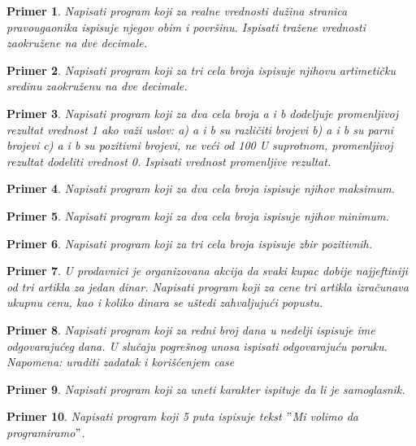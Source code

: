 \documentclass[a4paper]{article}
\newtheorem{primer}{Primer}[section]
\begin{document}
\begin{primer}
Napisati program koji za realne vrednosti dužina
stranica pravougaonika ispisuje njegov obim i površinu. Ispisati tražene vrednosti
zaokružene na dve decimale. 
\end{primer}

\begin{primer}
Napisati program koji za tri cela broja ispisuje
njihovu artimetičku sredinu zaokruženu na dve decimale.
\end{primer}

\begin{primer}
Napisati program koji za dva cela broja a i b dodeljuje
promenljivoj rezultat vrednost 1 ako važi uslov:
a) a i b su različiti brojevi
b) a i b su parni brojevi
c) a i b su pozitivni brojevi, ne veći od 100
U suprotnom, promenljivoj rezultat dodeliti vrednost 0. Ispisati vrednost promenljive
rezultat.
\end{primer}

\begin{primer}
Napisati program koji za dva cela broja ispisuje
njihov maksimum.
\end{primer}

\begin{primer}
Napisati program koji za dva cela broja ispisuje
njihov minimum.
\end{primer}

\begin{primer}
Napisati program koji za tri cela broja ispisuje zbir
pozitivnih.
\end{primer}

\begin{primer}
U prodavnici je organizovana akcija da svaki kupac dobije
najjeftiniji od tri artikla za jedan dinar. Napisati program koji za cene
tri artikla izračunava ukupnu cenu, kao i koliko dinara se uštedi zahvaljujući
popustu.
\end{primer}


\begin{primer}
Napisati program koji za redni broj dana u nedelji ispisuje
ime odgovarajućeg dana. U slučaju pogrešnog unosa ispisati odgovarajuću
poruku. Napomena: uraditi zadatak i korišćenjem case
\end{primer}

\begin{primer}
Napisati program koji za uneti karakter ispituje da li je
samoglasnik.
\end{primer}

\begin{primer}
Napisati program koji 5 puta ispisuje tekst $"$Mi volimo da
programiramo$"$.
\end{primer}
\end{document}
